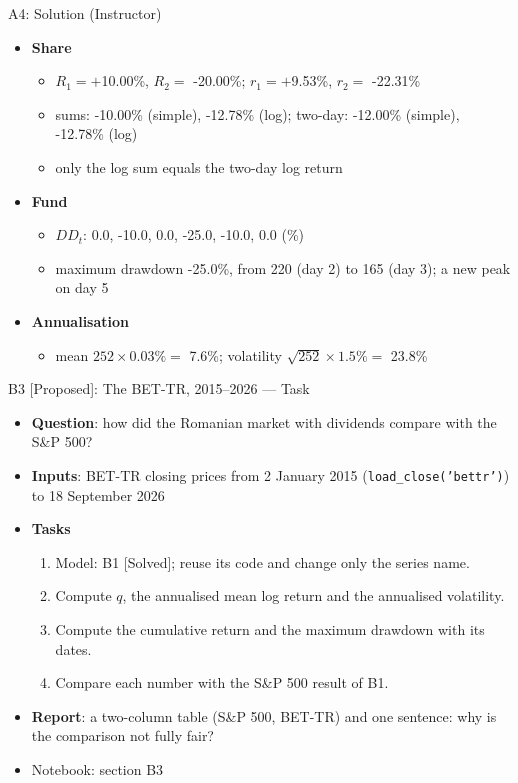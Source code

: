 \ifsolutions
\begin{frame}{A4: Solution (Instructor)}
\itemsize{\small}
\begin{itemize}
    \item \textbf{Share}
    \begin{itemize}
        \item $R_1 = +$10.00\%, $R_2 = $ -20.00\%; $r_1 = +$9.53\%, $r_2 = $ -22.31\%
        \item sums: -10.00\% (simple), -12.78\% (log); two-day: -12.00\% (simple), -12.78\% (log)
        \item only the log sum equals the two-day log return
    \end{itemize}
    \item \textbf{Fund}
    \begin{itemize}
        \item $DD_t$: 0.0, -10.0, 0.0, -25.0, -10.0, 0.0 (\%)
        \item maximum drawdown -25.0\%, from 220 (day 2) to 165 (day 3); a new peak on day 5
    \end{itemize}
    \item \textbf{Annualisation}
    \begin{itemize}
        \item mean $252 \times 0.03\% = $ 7.6\%; volatility $\sqrt{252} \times 1.5\% = $ 23.8\%
    \end{itemize}
\end{itemize}
\end{frame}
\fi

\begin{frame}{B3 [Proposed]: The BET-TR, 2015--2026 --- Task}
\itemsize{\small}
\begin{itemize}
\item \textbf{Question}: how did the Romanian market with dividends compare with the S\&P 500?
\item \textbf{Inputs}: BET-TR closing prices from 2 January 2015 (\texttt{load\_close('bettr')}) to 18 September 2026
\item \textbf{Tasks}
\begin{enumerate}
    \item Model: B1 [Solved]; reuse its code and change only the series name.
    \item Compute $q$, the annualised mean log return and the annualised volatility.
    \item Compute the cumulative return and the maximum drawdown with its dates.
    \item Compare each number with the S\&P 500 result of B1.
\end{enumerate}
\item \textbf{Report}: a two-column table (S\&P 500, BET-TR) and one sentence: why is the comparison not fully fair?
\item Notebook: section B3
\end{itemize}
\end{frame}


